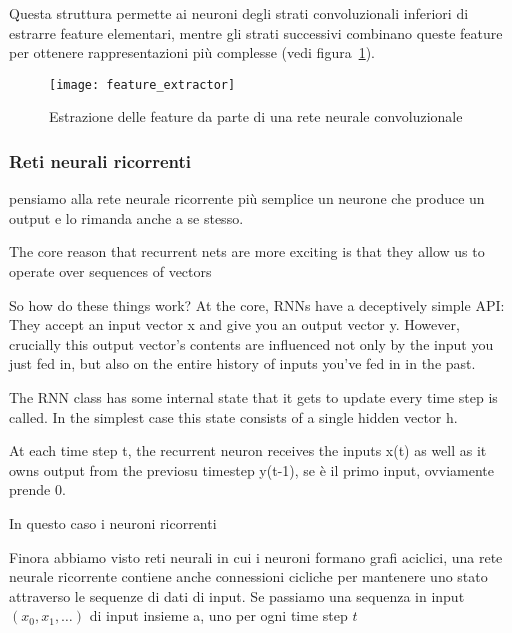 Questa struttura permette ai neuroni degli strati convoluzionali inferiori di
estrarre feature elementari, mentre gli strati successivi combinano queste
feature per ottenere rappresentazioni più complesse (vedi
figura~\ref{fig:feature_extractor}). 

\begin{figure}[!ht]
    \texttt{[image: feature\_extractor]}
    \caption{Estrazione delle feature da parte di una rete neurale convoluzionale \protect\cite{he2020}}
    \label{fig:feature_extractor}
\end{figure}

\subsubsection{Reti neurali ricorrenti}

pensiamo alla rete neurale ricorrente più semplice 
un neurone che produce un output e lo rimanda anche a se stesso.

The core reason that recurrent nets are more exciting is that they allow us to operate over sequences of vectors

 So how do these things work? At the core, RNNs have a deceptively simple API:
 They accept an input vector x and give you an output vector y. However,
 crucially this output vector’s contents are influenced not only by the input
 you just fed in, but also on the entire history of inputs you’ve fed in in
 the past. 

The RNN class has some internal state that it gets to update every time step
is called. In the simplest case this state consists of a single hidden vector
h.

At each time step t, the recurrent neuron receives the inputs x(t) as well  as
it owns output from the previosu timestep y(t-1), se è il primo input,
ovviamente prende 0.

In questo caso i neuroni ricorrenti 

Finora abbiamo visto reti neurali in cui i neuroni formano grafi aciclici, una
rete neurale ricorrente contiene anche connessioni cicliche per mantenere uno
stato attraverso le sequenze di dati di input. Se passiamo una sequenza in
input $(x_0, x_1, \ldots)$ di input insieme a, uno per ogni time step $t$




